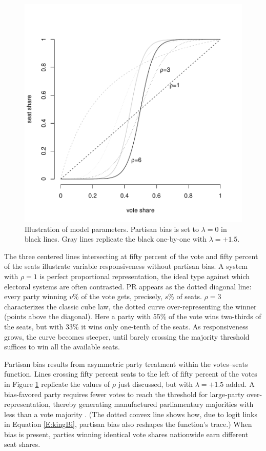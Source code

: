 \documentclass[letter,12pt]{article}
\begin{document}

\begin{figure}
\begin{center}
    \includegraphics[width=.55\columnwidth]{rhoExample.pdf} 
\caption{Illustration of model parameters. Partisan bias is set to $\lambda=0$ in black lines. Gray lines replicate the black one-by-one with $\lambda=+1.5$.}\label{F:lambdaRhoEx}
\end{center}
\end{figure}

The three centered lines intersecting at fifty percent of the vote and fifty percent of the seats illustrate variable responsiveness without partisan bias. A system with $\rho=1$ is perfect proportional representation, the ideal type against which electoral systems are often contrasted. PR appears as the dotted diagonal line: every party winning $v$\% of the vote gets, precisely, $s$\% of seats. $\rho=3$ characterizes the classic cube law, the dotted curve over-representing the winner (points above the diagonal). Here a party with 55\% of the vote wins two-thirds of the seats, but with 33\% it wins only one-tenth of the seats. As responsiveness grows, the curve becomes steeper, until barely crossing the majority threshold suffices to win all the available seats. 

Partisan bias results from asymmetric party treatment within the votes--seats function. Lines crossing fifty percent seats to the left of fifty percent of the votes in Figure \ref{F:lambdaRhoEx} replicate the values of $\rho$ just discussed, but with $\lambda = +1.5$ added. A bias-favored party requires fewer votes to reach the threshold for large-party over-representation, thereby generating manufactured parliamentary majorities with less than a vote majority \citep{lijphartElSysPtySys.1994}. (The dotted convex line shows how, due to logit links in Equation \ref{E:kingBi}, partisan bias also reshapes the function's trace.) When bias is present, parties winning identical vote shares nationwide earn different seat shares. 
\end{document}
